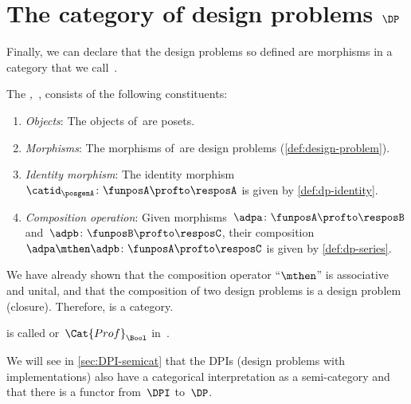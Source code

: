 
\section{The category of design problems $\DP$}

Finally, we can declare that the design problems so defined are morphisms in a category that we call~\iindex{\DP}.


\begin{definition}
    \label{def:DP}
    The \emph{,~\DP}, consists of the following constituents:
    \begin{enumerate}
        \item \emph{Objects}: The objects of~\DP are posets.
        \item \emph{Morphisms}: The morphisms of~\DP are design problems (\cref{def:design-problem}).
        \item \emph{Identity morphism}: The identity morphism~$\catid_\posgenA \colon \funposA \profto \resposA$ is given by \cref{def:dp-identity}.
        \item \emph{Composition operation}: Given morphisms~$\adpa \colon  \funposA \profto \resposB$ and~$\adpb \colon \funposB \profto \resposC$, their composition~$\adpa \mthen \adpb\colon \funposA\profto \resposC$ is given by \cref{def:dp-series}.
    \end{enumerate}
\end{definition}

We have already shown that the composition operator ``$\mthen$'' is associative and unital, and that the composition of two design problems is a design problem (closure).
Therefore, \DP is a category.

\begin{remark}
    \DP is called \feas or~$\Cat{Prof}_\Bool$ in~\cite{fong2019}.
\end{remark}

\begin{remark}
    We will see in \cref{sec:DPI-semicat} that the DPIs (design problems with implementations) also have a categorical interpretation as a semi-category \DPI and that there is a functor from~$\DPI$ to~$\DP$.
\end{remark}
